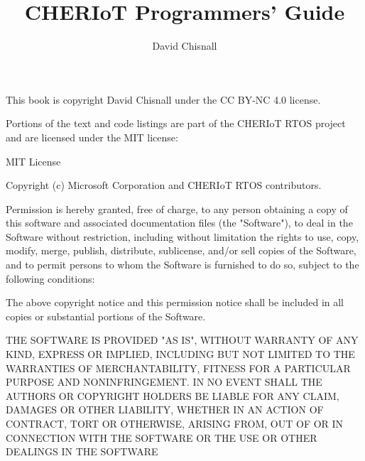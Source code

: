 \title{CHERIoT Programmers' Guide}
\author{David Chisnall}

\if[output=sile]{\eject{}\par{}}

This book is copyright David Chisnall under the CC BY-NC 4.0 license.

Portions of the text and code listings are part of the CHERIoT RTOS project and are licensed under the MIT license:

MIT License

Copyright (c) Microsoft Corporation and CHERIoT RTOS contributors.

Permission is hereby granted, free of charge, to any person obtaining a copy
of this software and associated documentation files (the "Software"), to deal
in the Software without restriction, including without limitation the rights
to use, copy, modify, merge, publish, distribute, sublicense, and/or sell
copies of the Software, and to permit persons to whom the Software is
furnished to do so, subject to the following conditions:

The above copyright notice and this permission notice shall be included in all
copies or substantial portions of the Software.

THE SOFTWARE IS PROVIDED "AS IS", WITHOUT WARRANTY OF ANY KIND, EXPRESS OR
IMPLIED, INCLUDING BUT NOT LIMITED TO THE WARRANTIES OF MERCHANTABILITY,
FITNESS FOR A PARTICULAR PURPOSE AND NONINFRINGEMENT. IN NO EVENT SHALL THE
AUTHORS OR COPYRIGHT HOLDERS BE LIABLE FOR ANY CLAIM, DAMAGES OR OTHER
LIABILITY, WHETHER IN AN ACTION OF CONTRACT, TORT OR OTHERWISE, ARISING FROM,
OUT OF OR IN CONNECTION WITH THE SOFTWARE OR THE USE OR OTHER DEALINGS IN THE
SOFTWARE


















